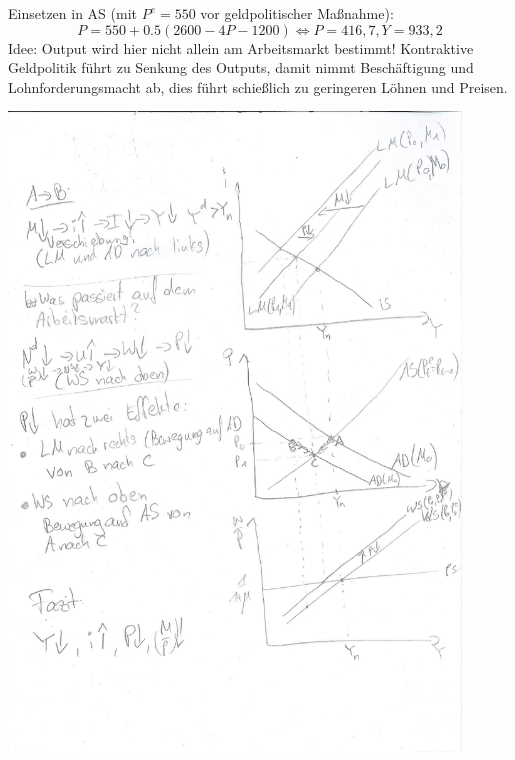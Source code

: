\documentclass{scrartcl}
\begin{document}
\begin{enumerate}[a)]
  Einsetzen in AS (mit $P^e=550$ vor geldpolitischer Ma{\ss}nahme):
  $$ P = 550 + 0.5(2600-4P-1200) \Leftrightarrow P = 416,7, Y = 933,2$$
  Idee: Output wird hier nicht allein am Arbeitsmarkt bestimmt! Kontraktive Geldpolitik f\"{u}hrt zu Senkung des Outputs, damit nimmt Besch\"{a}ftigung und Lohnforderungsmacht ab, dies f\"{u}hrt schie{\ss}lich zu geringeren L\"{o}hnen und Preisen.
          \begin{center}
  \includegraphics[width=0.9\textwidth]{Bilder/ASAD3.pdf}
  \end{center}
\end{enumerate}
\end{document}
